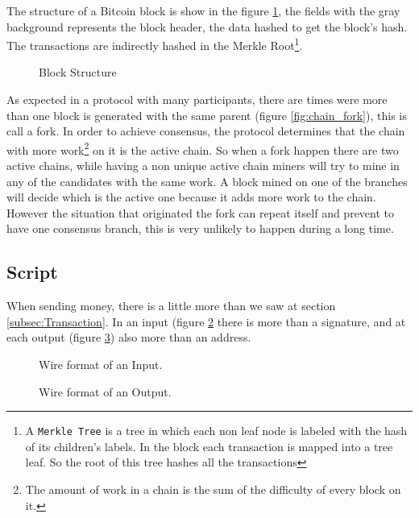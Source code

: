 The structure of a Bitcoin block is show in the figure \ref{fig:block_pow}, the
  fields with the gray background represents the block header, the data hashed
  to get the block's hash.
The transactions are indirectly hashed in the Merkle Root\footnote{A
  \texttt{Merkle Tree} is a tree in which each non leaf node is labeled with
  the hash of its children's labels. In the block each transaction is mapped
  into a tree leaf. So the root of this tree hashes all the transactions}.

  \begin{figure}[ht]
	\centering
	
	\caption{Block Structure}
	\label{fig:block_pow}
\end{figure}

As expected in a protocol with many participants, there are times were more
  than one block is generated with the same parent (figure
  \ref{fig:chain_fork}), this is call a fork.
In order to achieve consensus, the protocol determines that the chain with
  more work\footnote{The amount of work in a chain is the sum of the difficulty
  of every block on it.} on it is the active chain.
So when a fork happen there are two active chains, while having a non unique
  active chain miners will try to mine in any of the candidates with the same
  work.
A block mined on one of the branches will decide which is the active one
  because it adds more work to the chain. However the situation that originated
  the fork can repeat itself and prevent to have one consensus branch, this is
  very unlikely\cite{decker2013information} to happen during a long time.

  \subsection{Script}

When sending money, there is a little more than we saw at section
  \ref{subsec:Transaction}. In an input (figure \ref{fig:input} there is more
  than a signature, and at each output (figure \ref{fig:output}) also more than
  an address.

  \begin{figure}[ht]
	\centering
	
	\caption{Wire format of an Input.}
	\label{fig:input}
\end{figure}

\begin{figure}[ht]
	\centering
	
	\caption{Wire format of an Output.}
	\label{fig:output}
\end{figure}

